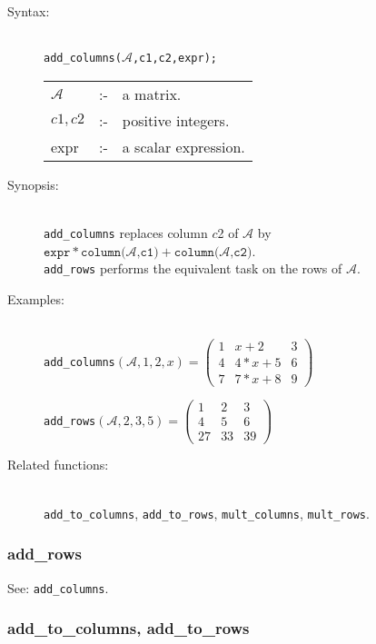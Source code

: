 \begin{description}
\item[Syntax:]\mbox{}\\
\texttt{add\_columns($\mathcal{A}$,c1,c2,expr);}

\begin{tabular}{l l l}
$\mathcal{A}$ & :- & a matrix. \\
$c1,c2$      & :- & positive integers. \\
expr       & :- & a scalar expression.
\end{tabular}

\item[Synopsis:]\mbox{}\\
\texttt{add\_columns} replaces column $c$2 of $\mathcal{A}$ by\\
$\texttt{expr} * \texttt{column($\mathcal{A}$,c1)} + \texttt{column($\mathcal{A}$,c2)}$.\\
\texttt{add\_rows} performs the equivalent task on the rows of $\mathcal{A}$.

\item[Examples:]\mbox{}\\
  \texttt{add\_columns}\((\mathcal{A},1,2,x)  =
  \begin{pmatrix} 1 & x+2 & 3 \\ 4 & 4*x+5 & 6 \\ 7 & 7*x+8 & 9 \end{pmatrix}\)

  \texttt{add\_rows}\((\mathcal{A},2,3,5)  =
  \begin{pmatrix} 1 & 2 & 3 \\ 4 & 5 & 6 \\ 27 & 33 & 39 \end{pmatrix}\)

\item[Related functions:]\mbox{}\\
\texttt{add\_to\_columns}, \texttt{add\_to\_rows},
\texttt{mult\_columns}, \texttt{mult\_rows}.
\end{description}

\subsubsection{add\_rows}
\label{linalg:add_rows}
\hypertarget{operator:ADD_ROWS}{}

See: \texttt{add\_columns}.


\subsubsection{add\_to\_columns, add\_to\_rows}
\label{linalg:add_to_columns}
\hypertarget{operator:ADD_TO_COLUMNS}{}

